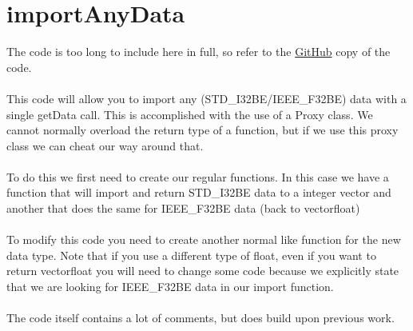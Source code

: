 \documentclass[11pt]{article}   %
\begin{document}
\section*{importAnyData}
The code is too long to include here in full, so refer to the \href{https://github.com/stevenwalton/tutorials/blob/master/h5/importAnyData.cpp}{GitHub} copy of the code.\\ \\
This code will allow you to import any (STD\_I32BE/IEEE\_F32BE) data with a single getData call. 
This is accomplished with the use of a Proxy class. We cannot normally overload the return type
of a function, but if we use this proxy class we can cheat our way around that. 
\\ \\
To do this we first need to create our regular functions. In this case we have a function that will
import and return STD\_I32BE data to a integer vector and another that does the same for IEEE\_F32BE
data (back to vector\textlangle{}float\textrangle{})
\\ \\
To modify this code you need to create another normal like function for the new data type. Note that
if you use a different type of float, even if you want to return vector\textlangle{}float\textrangle{}
you will need to change some code because we explicitly state that we are looking for IEEE\_F32BE
data in our import function.
\\ \\
The code itself contains a lot of comments, but does build upon previous work.
\end{document}
